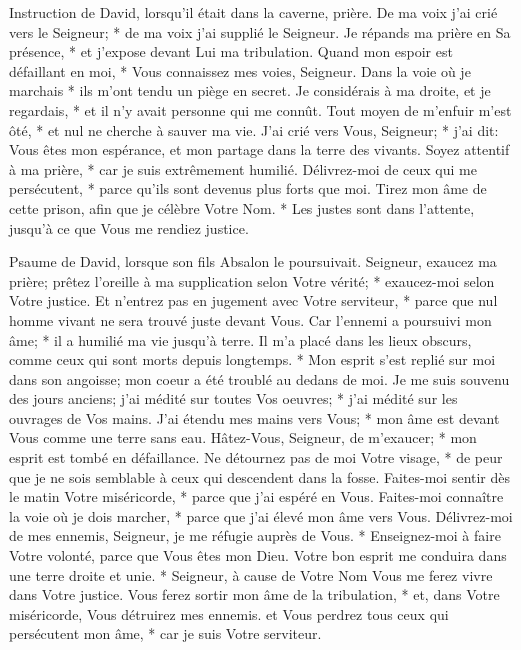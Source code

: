 Instruction de David, lorsqu'il était dans la caverne, prière.
De ma voix j'ai crié vers le Seigneur; * de ma voix j'ai supplié le Seigneur.
Je répands ma prière en Sa présence, * et j'expose devant Lui ma tribulation.
Quand mon espoir est défaillant en moi, * Vous connaissez mes voies, Seigneur. Dans la voie où je marchais * ils m'ont tendu un piège en secret.
Je considérais à ma droite, et je regardais, * et il n'y avait personne qui me connût. Tout moyen de m'enfuir m'est ôté, * et nul ne cherche à sauver ma vie.
J'ai crié vers Vous, Seigneur; * j'ai dit: Vous êtes mon espérance, et mon partage dans la terre des vivants.
Soyez attentif à ma prière, * car je suis extrêmement humilié. Délivrez-moi de ceux qui me persécutent, * parce qu'ils sont devenus plus forts que moi.
Tirez mon âme de cette prison, afin que je célèbre Votre Nom. * Les justes sont dans l'attente, jusqu'à ce que Vous me rendiez justice.

Psaume de David, lorsque son fils Absalon le poursuivait. Seigneur, exaucez ma prière; prêtez l'oreille à ma supplication selon Votre vérité; * exaucez-moi selon Votre justice.
Et n'entrez pas en jugement avec Votre serviteur, * parce que nul homme vivant ne sera trouvé juste devant Vous.
Car l'ennemi a poursuivi mon âme; * il a humilié ma vie jusqu'à terre. Il m'a placé dans les lieux obscurs, comme ceux qui sont morts depuis longtemps. *
Mon esprit s'est replié sur moi dans son angoisse; mon coeur a été troublé au dedans de moi.
Je me suis souvenu des jours anciens; j'ai médité sur toutes Vos oeuvres; * j'ai médité sur les ouvrages de Vos mains.
J'ai étendu mes mains vers Vous; * mon âme est devant Vous comme une terre sans eau.
Hâtez-Vous, Seigneur, de m'exaucer; * mon esprit est tombé en défaillance. Ne détournez pas de moi Votre visage, * de peur que je ne sois semblable à ceux qui descendent dans la fosse.
Faites-moi sentir dès le matin Votre miséricorde, * parce que j'ai espéré en Vous. Faites-moi connaître la voie où je dois marcher, * parce que j'ai élevé mon âme vers Vous.
Délivrez-moi de mes ennemis, Seigneur, je me réfugie auprès de Vous. *
Enseignez-moi à faire Votre volonté, parce que Vous êtes mon Dieu. Votre bon esprit me conduira dans une terre droite et unie. *
Seigneur, à cause de Votre Nom Vous me ferez vivre dans Votre justice. Vous ferez sortir mon âme de la tribulation, *
et, dans Votre miséricorde, Vous détruirez mes ennemis. et Vous perdrez tous ceux qui persécutent mon âme, * car je suis Votre serviteur.

